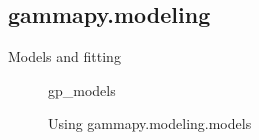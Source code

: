 \subsection{gammapy.modeling}
\label{ssec:gammapy-modeling}
Models and fitting

\begin{figure}
	{gp_models}
	\caption{Using gammapy.modeling.models}
	\label{fig*:minted:gp_models}
\end{figure}
